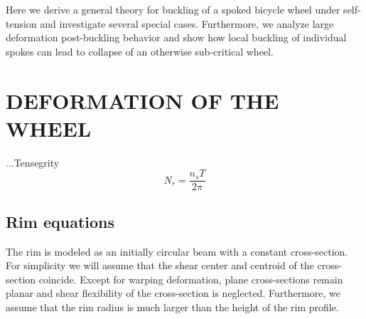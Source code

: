 \documentclass{bmd2016p}
\begin{document}
Here we derive a general theory for buckling of a spoked bicycle wheel under self-tension and investigate several special cases. Furthermore, we analyze large deformation post-buckling behavior and show how local buckling of individual spokes can lead to collapse of an otherwise sub-critical wheel.




\section{DEFORMATION OF THE WHEEL}
...Tensegrity
\begin{equation}\label{eq:TN}
N_r = \frac{n_sT}{2\pi}
\end{equation}



\subsection{Rim equations}

The rim is modeled as an initially circular beam with a constant cross-section. For simplicity we will assume that the shear center and centroid of the cross-section coincide. Except for warping deformation, plane cross-sections remain planar and shear flexibility of the cross-section is neglected. Furthermore, we assume that the rim radius is much larger than the height of the rim profile.
\end{document}
